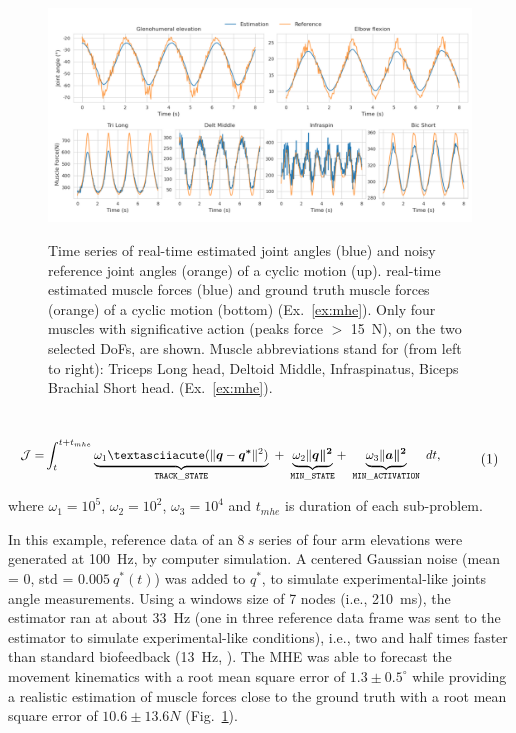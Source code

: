 \begin{figure}[t!] 
\centering 
\includegraphics[width=\textwidth]{figures/MHE_results.pdf}\\ 
\caption{Time series of real-time estimated joint angles (blue) and noisy reference joint angles (orange) of a cyclic motion (up). real-time estimated muscle forces (blue) and ground truth muscle forces (orange) of a cyclic motion (bottom) (Ex.~\ref{ex:mhe}). Only four muscles with significative action (peaks force $>$ 15~N), on the two selected DoFs, are shown.
Muscle abbreviations stand for (from left to right): Triceps Long head, Deltoid Middle, Infraspinatus, Biceps Brachial Short head. (Ex.~\ref{ex:mhe}).} 
\label{fig:MHE_results}
\end{figure} 
\\ 
\[ 
\resizebox{0.9\columnwidth}{!}{$ 
\begin{aligned}
\mathcal{J} = &\int_t^{t+t_{mhe}}\underbrace{\omega_1´(\|\boldsymbol{q} - \boldsymbol{q^*}\|^{2})}_{\mathtt{TRACK\_STATE}}~ 
+ ~ \underbrace{\omega_2\|\boldsymbol{q\|^2}}_{\mathtt{MIN\_STATE}} 
+ ~ \underbrace{\omega_3\|\boldsymbol{a\|^2}}_{\mathtt{MIN\_ACTIVATION}}~dt, 
\end{aligned}   
$}  
\addtag  
\label{eq:ocp_exMHE}  
\]  

\noindent where $\omega_1 =10^5$, $\omega_2 = 10^2$, $\omega_3 = 10^4$ and $t_{mhe}$ is duration of each sub-problem. 

In this example, reference data of an $8~s$ series of four arm elevations were generated at 100~Hz, by computer simulation.
A centered Gaussian noise (mean = 0, std = $0.005\:q^*(t)$) was added to $q^*$, to simulate experimental-like joints angle measurements.
Using a windows size of 7 nodes (i.e., 210~ms), the estimator ran at about 33~Hz (one in three reference data frame was sent to the estimator to simulate experimental-like conditions), i.e., two and half times faster than standard biofeedback (13~Hz, \cite{kannape2013self}).
The MHE was able to forecast the movement kinematics with a root mean square error of $1.3\pm0.5^{\circ}$ while providing a realistic estimation of muscle forces close to the ground truth with a root mean square error of $10.6\pm13.6N$ (Fig.~\ref{fig:MHE_results}).

